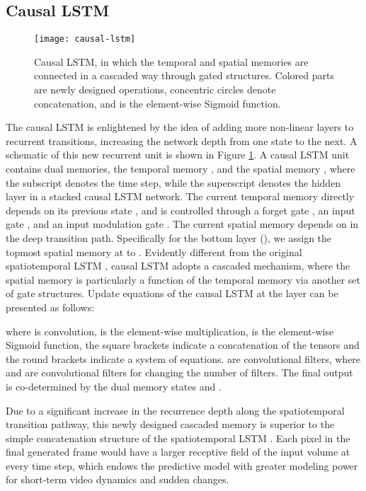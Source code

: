 \documentclass{article}
\begin{document}
\subsection{Causal LSTM}

\begin{figure}[htb]
\vskip 0.15in
\centering
\texttt{[image: causal-lstm]}
\caption{Causal LSTM, in which the temporal and spatial memories are connected in a cascaded way through gated structures. Colored parts are newly designed operations, concentric circles denote concatenation, and  is the element-wise Sigmoid function.}
\label{fig:causal_lstm}
\end{figure}

The causal LSTM is enlightened by the idea of adding more non-linear layers to recurrent transitions, increasing the network depth from one state to the next. A schematic of this new recurrent unit is shown in Figure \ref{fig:causal_lstm}. A causal LSTM unit contains dual memories, the temporal memory , and the spatial memory , where the subscript  denotes the time step, while the superscript denotes the  hidden layer in a stacked causal LSTM network. The current temporal memory directly depends on its previous state , and is controlled through a forget gate , an input gate , and an input modulation gate . The current spatial memory  depends on  in the deep transition path.  Specifically for the bottom layer (), we assign the topmost spatial memory at  to . Evidently different from the original spatiotemporal LSTM \cite{wang2017predrnn}, causal LSTM adopts a cascaded mechanism, where the spatial memory is particularly a function of the temporal memory via another set of gate structures. Update equations of the causal LSTM at the  layer can be presented as follows:




where  is convolution,  is the element-wise multiplication,  is the element-wise Sigmoid function, the square brackets indicate a concatenation of the tensors and the round brackets indicate a system of equations.  are convolutional filters, where  and  are  convolutional filters for changing the number of filters. The final output  is co-determined by the dual memory states  and .

Due to a significant increase in the recurrence depth along the spatiotemporal transition pathway, this newly designed cascaded memory is superior to the simple concatenation structure of the spatiotemporal LSTM \cite{wang2017predrnn}. Each pixel in the final generated frame  would have a larger receptive field of the input volume at every time step, which endows the predictive model with greater modeling power for short-term video dynamics and sudden changes.  
\end{document}
